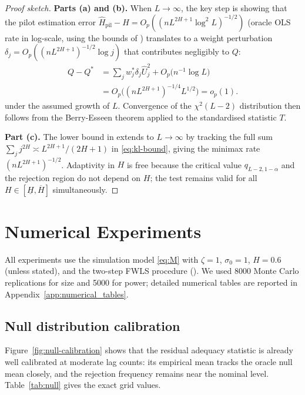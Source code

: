 \documentclass[10pt,a4paper,twocolumn]{article}
\begin{document}
\begin{proof}[Proof sketch]
\textbf{Parts (a) and (b).}
When $L \to \infty$, the key step is showing that the pilot estimation
error $\hat H_{\mathrm{pil}} - H = O_p((nL^{2H+1}\log^2 L)^{-1/2})$
(oracle OLS rate in log-scale, using the bounds of )
translates to a weight perturbation $\delta_j = O_p((nL^{2H+1})^{-1/2}
\log j)$ that contributes negligibly to $Q$:
\begin{align*}
    Q - Q^* &= \sum_j w_j^* \delta_j \hat U_j^2 + O_p\bigl(n^{-1}\log L\bigr) \\
            &= O_p\bigl((nL^{2H+1})^{-1/4} L^{1/2}\bigr) = o_p(1).
\end{align*}
under the assumed growth of $L$.  Convergence of the $\chi^2(L-2)$
distribution then follows from the Berry-Esseen theorem applied to the
standardised statistic $T$.

\textbf{Part (c).}
The lower bound in  extends to $L \to \infty$ by
tracking the full sum $\sum_j j^{2H} \asymp L^{2H+1}/(2H+1)$ in
\eqref{eq:kl-bound}, giving the minimax rate $(nL^{2H+1})^{-1/2}$.
Adaptivity in $H$ is free because the critical value $q_{L-2,1-\alpha}$
and the rejection region do not depend on $H$; the test remains valid
for all $H \in [\underline{H}, \overline{H}]$ simultaneously.
\end{proof}

\section{Numerical Experiments}
\label{sec:sims}

All experiments use the simulation model \eqref{eq:M} with $\zeta = 1$,
$\sigma_0 = 1$, $H = 0.6$ (unless stated), and the two-step FWLS procedure
().  We used 8000 Monte Carlo replications for size and
5000 for power; detailed numerical tables are reported in
Appendix~\ref{app:numerical_tables}.

\subsection{Null distribution calibration}

Figure~\ref{fig:null-calibration} shows that the residual adequacy statistic
is already well calibrated at moderate lag counts: its empirical mean tracks
the oracle null mean closely, and the rejection frequency remains near the
nominal level.  Table~\ref{tab:null} gives the exact grid values.
\end{document}
